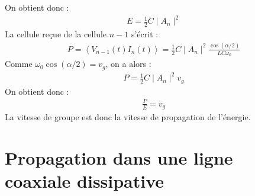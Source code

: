 \documentclass{report}
\begin{document}
\begin{itemize}
	   	On obtient donc :
	   	\begin{align*}
	   		E=\frac{1}{2}C\mid A_n\mid^2
	   	\end{align*}
	   	La cellule reçue de la cellule $n-1$ s'écrit :
	   	\begin{align*}
	   		P=\left\langle V_{n-1}(t)I_n(t) \right\rangle =\frac{1}{2}C\mid A_n\mid^2\frac{\cos(\alpha/2)}{LC\omega_0}
	   	\end{align*}
	   	Comme $\omega_0\cos(\alpha/2)=v_g$, on a alors :
	   	\begin{align*}
	   		P=\frac{1}{2}C\mid A_n\mid^2v_g
	   	\end{align*}
	   	On obtient donc :
	   	\begin{align*}
	   		\frac{P}{E}=v_g
	   	\end{align*}
	   	La vitesse de groupe est donc la vitesse de propagation de l'énergie. 

\end{itemize}

\section*{Propagation dans une ligne coaxiale dissipative}
\end{document}
